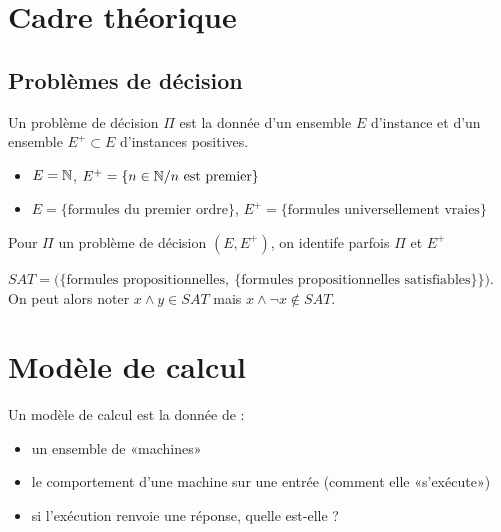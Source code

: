 
\section{Cadre théorique}

\subsection{Problèmes de décision}

\begin{definition}
	Un problème de décision $\Pi$ est la donnée d'un ensemble $E$ d'instance et d'un ensemble $E^+\subset E$ d'instances positives.
\end{definition}

\begin{example}
	\begin{itemize}[label=$\bullet$]
		\item $E = \mathbb{N}$, $E^+ = \{n \in \mathbb{N} / n \text{ est premier}\}$
		\item $E = \{\text{formules du premier ordre}\}$, $E^+ =\{\text{formules universellement vraies}\}$
	\end{itemize}
\end{example}

\begin{personalise}[notation]
	Pour $\Pi$ un problème de décision $(E, E^+)$, on identife parfois $\Pi$ et $E^+$
\end{personalise}

\begin{example}
	$SAT = \Big( \{\text{formules propositionnelles}, \: \{\text{formules propositionnelles satisfiables}\}\}\Big)$. On peut alors noter $x\wedge y \in SAT$ mais $x\wedge \neg x\notin SAT$.
\end{example}

\section{Modèle de calcul}

\begin{definition}
	Un modèle de calcul est la donnée de :
	\begin{itemize}
		\item un ensemble de «machines»
		\item le comportement d'une machine sur une entrée (comment elle «s'exécute»)
		\item si l'exécution renvoie une réponse, quelle est-elle ?
	\end{itemize}
\end{definition}

